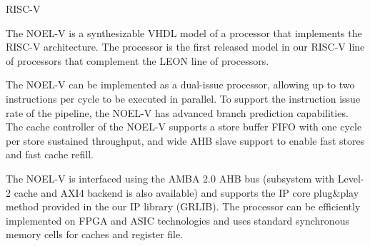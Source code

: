 RISC-V \cite{waterman2016}

The NOEL-V \cite{andersson2020} is a synthesizable VHDL model of a processor that implements the RISC-V architecture. The processor is the first released model in our RISC-V line of processors that complement the LEON line of processors.

The NOEL-V can be implemented as a dual-issue processor, allowing up to two instructions per cycle to be executed in parallel. To support the instruction issue rate of the pipeline, the NOEL-V has advanced branch prediction capabilities. The cache controller of the NOEL-V supports a store buffer FIFO with one cycle per store sustained throughput, and wide AHB slave support to enable fast stores and fast cache refill.

The NOEL-V is interfaced using the AMBA 2.0 AHB bus (subsystem with Level-2 cache and AXI4 backend is also available) and supports the IP core plug\&play method provided in the our IP library (GRLIB). The processor can be efficiently implemented on FPGA and ASIC technologies and uses standard synchronous memory cells for caches and register file.
